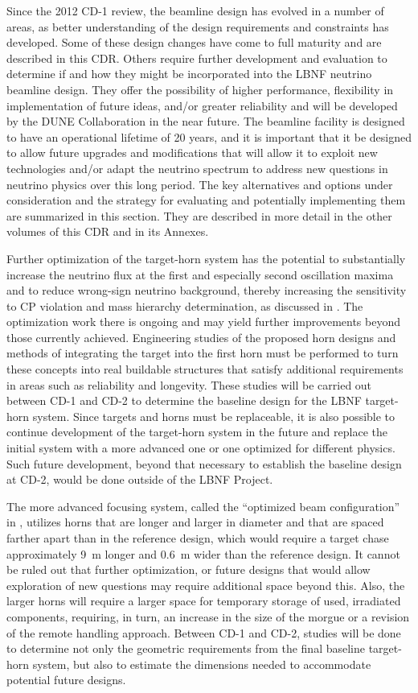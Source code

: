 Since the 2012 CD-1 review, the beamline design has evolved in a number of areas, as better understanding of the design requirements and constraints has developed.  Some of these design changes have come to full maturity and are 
described in this CDR.  Others require further development and evaluation to determine if and how they might be incorporated into the LBNF neutrino beamline design.  They offer the possibility of higher performance, flexibility in 
implementation of future ideas, and/or greater reliability and will be developed by the DUNE
Collaboration in the near future. The beamline facility is designed to have an operational lifetime of 20 years, and it is important that it be designed to allow future upgrades and modifications that will allow it to 
exploit new 
technologies and/or adapt the neutrino spectrum to address new questions in neutrino physics over this long period. The key alternatives and options under consideration and the strategy for evaluating and potentially implementing them are summarized in this section.  They are described in more detail in the other volumes of this CDR and in its Annexes.  
               
 
Further optimization of the target-horn system has the potential to substantially increase the neutrino flux at the first and especially second oscillation maxima and to reduce wrong-sign neutrino background, thereby increasing the sensitivity to CP 
violation and mass hierarchy determination, as discussed in \volphys.  The optimization work there is ongoing and may yield further improvements beyond those currently achieved. Engineering studies of the proposed horn designs and methods 
of integrating the target into the first horn must be performed to turn these concepts into real buildable structures that satisfy additional requirements in areas such as reliability and longevity.  These studies will be carried out between CD-1 and CD-2 to 
determine the baseline design for the LBNF target-horn system.  Since targets and horns must be replaceable, it is also possible to continue development of the target-horn system in the future and replace the initial system with a more advanced 
one or one optimized for different physics.  Such future development, beyond that necessary to establish the baseline design at CD-2, would be done outside of the LBNF Project.
 
The more advanced focusing system, called the ``optimized beam configuration'' in \volphys, utilizes horns that are longer and larger in diameter and that are spaced farther apart than in the reference design, which would require a target chase approximately 9~m longer and 0.6~m wider 
than the reference design.  It cannot be ruled out that further optimization, or future designs that would
allow exploration of new questions may require additional space beyond this.  Also, the larger horns will require a larger 
space for temporary storage of used, irradiated components, requiring, in turn, an increase in the size of the morgue or a revision of the remote handling approach.  Between CD-1 and CD-2, studies will be done to determine not only the geometric 
requirements from the final baseline target-horn system, but also to estimate the dimensions needed to accommodate potential future designs.
 
